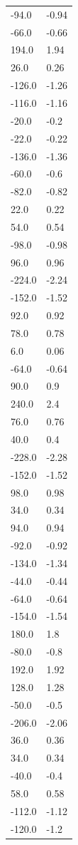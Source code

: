 \begin{longtable}{ll}
-94.0 & -0.94 \\
-66.0 & -0.66 \\
194.0 & 1.94 \\
26.0 & 0.26 \\
-126.0 & -1.26 \\
-116.0 & -1.16 \\
-20.0 & -0.2 \\
-22.0 & -0.22 \\
-136.0 & -1.36 \\
-60.0 & -0.6 \\
-82.0 & -0.82 \\
22.0 & 0.22 \\
54.0 & 0.54 \\
-98.0 & -0.98 \\
96.0 & 0.96 \\
-224.0 & -2.24 \\
-152.0 & -1.52 \\
92.0 & 0.92 \\
78.0 & 0.78 \\
6.0 & 0.06 \\
-64.0 & -0.64 \\
90.0 & 0.9 \\
240.0 & 2.4 \\
76.0 & 0.76 \\
40.0 & 0.4 \\
-228.0 & -2.28 \\
-152.0 & -1.52 \\
98.0 & 0.98 \\
34.0 & 0.34 \\
94.0 & 0.94 \\
-92.0 & -0.92 \\
-134.0 & -1.34 \\
-44.0 & -0.44 \\
-64.0 & -0.64 \\
-154.0 & -1.54 \\
180.0 & 1.8 \\
-80.0 & -0.8 \\
192.0 & 1.92 \\
128.0 & 1.28 \\
-50.0 & -0.5 \\
-206.0 & -2.06 \\
36.0 & 0.36 \\
34.0 & 0.34 \\
-40.0 & -0.4 \\
58.0 & 0.58 \\
-112.0 & -1.12 \\
-120.0 & -1.2 \\

\end{longtable}
